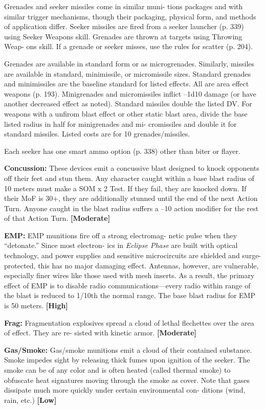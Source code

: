 Grenades and seeker missiles come in similar muni-
tions packages and with similar trigger mechanisms, 
though their packaging, physical form, and methods 
of application differ. Seeker missiles are fired from a 
seeker launcher (p. 339) using Seeker Weapons skill. 
Grenades are thrown at targets using Throwing Weap-
ons skill. If a grenade or seeker misses, use the rules 
for scatter (p. 204).

Grenades are available in standard form or as 
microgrenades. Similarly, missiles are available in 
standard, minimissile, or micromissile sizes. Standard 
grenades and minimissiles are the baseline standard 
for listed effects. All are area effect weapons (p. 193). 
Minigrenades and micromissiles inflict –1d10 damage 
(or have another decreased effect as noted). Standard 
missiles double the listed DV. For weapons with a 
unfirom blast effect or other static blast area, divide 
the base listed radius in half for minigrenades and mi-
cromissiles and double it for standard missiles. Listed 
costs are for 10 grenades/missiles.

Each seeker has one smart ammo option (p. 338) 
other than biter or flayer.

\textbf{Concussion:} These devices emit a concussive blast 
designed to knock opponents off their feet and stun 
them. Any character caught within a base blast radius 
of 10 meters must make a SOM x 2 Test. If they fail, 
they are knocked down. If their MoF is 30+, they are 
additionally stunned until the end of the next Action 
Turn. Anyone caught in the blast radius suffers a 
–10 action modifier for the rest of that Action Turn. 
\textbf{[Moderate]}

\textbf{EMP:} EMP munitions fire off a strong electromag-
netic pulse when they ``detonate.'' Since most electron-
ics in \textit{Eclipse Phase} are built with optical technology, 
and power supplies and sensitive microcircuits are 
shielded and surge-protected, this has no major 
damaging effect. Antennas, however, are vulnerable, 
especially finer wires like those used with mesh inserts. 
As a result, the primary effect of EMP is to disable 
radio communications—every radio within range of 
the blast is reduced to 1/10th the normal range. The 
base blast radius for EMP is 50 meters. \textbf{[High]}

\textbf{Frag:} Fragmentation explosives spread a cloud of 
lethal flechettes over the area of effect. They are re-
sisted with kinetic armor. \textbf{[Moderate]}

\textbf{Gas/Smoke:} Gas/smoke munitions emit a cloud of 
their contained substance. Smoke impedes sight by 
releasing thick fumes upon ignition of the seeker. The 
smoke can be of any color and is often heated (called 
thermal smoke) to obfuscate heat signatures moving 
through the smoke as cover. Note that gases dissipate 
much more quickly under certain environmental con-
ditions (wind, rain, etc.) \textbf{[Low]}

